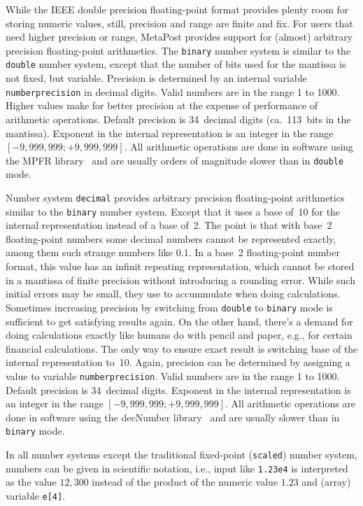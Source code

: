 While the IEEE double precision floating-point format provides plenty
room for storing numeric values, still, precision and range are finite
and fix.  For users that need higher precision or range, MetaPost
provides support for (almost) arbitrary precision floating-point
arithmetics.  The \texttt{binary} number
system is similar to the \texttt{double} number system, except that the
number of bits used for the mantissa is not fixed, but variable.
Precision is determined by an internal variable
\texttt{numberprecision}\label{Dnumberprecision}
in decimal digits.  Valid numbers are in the range 1 to 1000.  Higher
values make for better precision at the expense of performance of
arithmetic operations.  Default precision is 34~decimal digits
(ca.~113~bits in the mantissa).  Exponent in the internal representation
is an integer in the range $[-9,999,999; +9,999,999]$.  All arithmetic
operations are done in software using the MPFR library~\cite{lib:mpfr}
and are usually orders of magnitude slower than in \texttt{double} mode.

Number system \texttt{decimal} provides
arbitrary precision floating-point arithmetics similar to the
\texttt{binary} number system.  Except that it uses a base of~10 for the
internal representation instead of a base of~2.  The point is that with
base~2 floating-point numbers some decimal numbers cannot be represented
exactly, among them such strange numbers like $0.1$.  In a base~2
floating-point number format, this value has an infinit repeating
representation, which cannot be stored in a mantissa of finite precision
without introducing a rounding error.  While such initial errors may be
small, they use to accummulate when doing calculations.  Sometimes
increasing precision by switching from \texttt{double} to
\texttt{binary} mode is sufficient to get satisfying results again.  On
the other hand, there's a demand for doing calculations exactly like
humans do with pencil and paper, e.g., for certain financial
calculations.  The only way to ensure exact result is switching base of
the internal representation to~10.  Again, precision can be determined
by assigning a value to variable
\texttt{numberprecision}.
Valid numbers are in the range 1 to 1000.  Default precision is
34~decimal digits.  Exponent in the internal representation is an
integer in the range $[-9,999,999; +9,999,999]$.  All arithmetic
operations are done in software using the decNumber
library~\cite{lib:decnumber} and are usually slower than in
\texttt{binary} mode.

In all number systems except the traditional fixed-point
(\texttt{scaled}) number system, numbers can be given in scientific
notation, i.e., input like \texttt{1.23e4} is interpreted as the value
$12,300$ instead of the product of the numeric value $1.23$ and (array)
variable \verb|e[4]|.



